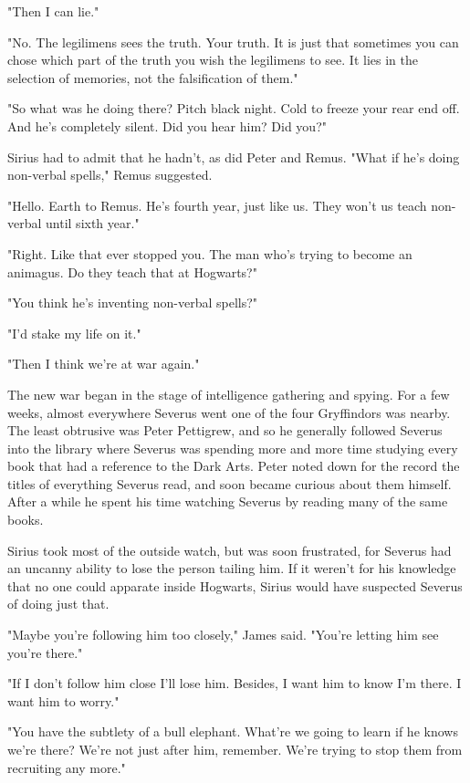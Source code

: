 "Then I can lie."

"No. The legilimens sees the truth. Your truth. It is just that sometimes you can chose which part of the truth you wish the legilimens to see. It lies in the selection of memories, not the falsification of them."

\sbreak

"So what was he doing there? Pitch black night. Cold to freeze your{\el} rear end off. And he's completely silent. Did you hear him? Did you?"

Sirius had to admit that he hadn't, as did Peter and Remus. "What if he's doing non-verbal spells," Remus suggested.

"Hello. Earth to Remus. He's fourth year, just like us. They won't us teach non-verbal until sixth year."

"Right. Like that ever stopped you. The man who's trying to become an animagus. Do they teach that at Hogwarts?"

"You think he's inventing non-verbal spells?"

"I'd stake my life on it."

"Then I think we're at war again."

The new war began in the stage of intelligence gathering and spying. For a few weeks, almost everywhere Severus went one of the four Gryffindors was nearby. The least obtrusive was Peter Pettigrew, and so he generally followed Severus into the library where Severus was spending more and more time studying every book that had a reference to the Dark Arts. Peter noted down for the record the titles of everything Severus read, and soon became curious about them himself. After a while he spent his time watching Severus by reading many of the same books.

Sirius took most of the outside watch, but was soon frustrated, for Severus had an uncanny ability to lose the person tailing him. If it weren't for his knowledge that no one could apparate inside Hogwarts, Sirius would have suspected Severus of doing just that.

"Maybe you're following him too closely," James said. "You're letting him see you're there."

"If I don't follow him close I'll lose him. Besides, I want him to know I'm there. I want him to worry."

"You have the subtlety of a bull elephant. What're we going to learn if he knows we're there? We're not just after him, remember. We're trying to stop them from recruiting any more."

